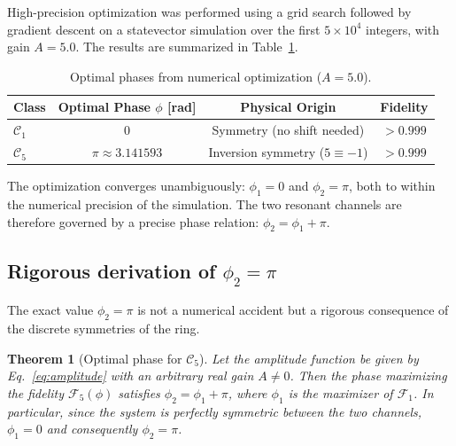 \documentclass[12pt,a4paper]{article}
\theoremstyle{plain}
\newtheorem{theorem}{Theorem}[section]
\theoremstyle{definition}
\theoremstyle{remark}
\begin{document}
High-precision optimization was performed using a grid search followed by gradient descent on a statevector simulation over the first \(5 \times 10^4\) integers, with gain \(A = 5.0\). The results are summarized in Table~\ref{tab:phases}.

\begin{table}[H]
\centering
\caption{Optimal phases from numerical optimization (\(A=5.0\)).}
\label{tab:phases}
\begin{tabular}{lccc}
\toprule
Class & Optimal Phase \(\phi\) [rad] & Physical Origin & Fidelity \\
\midrule
\(\mathcal{C}_1\) & \(0\) & Symmetry (no shift needed) & \(>0.999\) \\
\(\mathcal{C}_5\) & \(\pi \approx 3.141593\) & Inversion symmetry (\(5 \equiv -1\)) & \(>0.999\) \\
\bottomrule
\end{tabular}
\end{table}

The optimization converges unambiguously: \(\phi_1 = 0\) and \(\phi_2 = \pi\), both to within the numerical precision of the simulation. The two resonant channels are therefore governed by a precise phase relation: \(\phi_2 = \phi_1 + \pi\).

\subsection{Rigorous derivation of \(\phi_2 = \pi\)}
The exact value \(\phi_2 = \pi\) is not a numerical accident but a rigorous consequence of the discrete symmetries of the ring.

\begin{theorem}[Optimal phase for \(\mathcal{C}_5\)]
\label{thm:phi2}
Let the amplitude function be given by Eq.~\eqref{eq:amplitude} with an arbitrary real gain \(A \neq 0\). Then the phase maximizing the fidelity \(\mathcal{F}_5(\phi)\) satisfies \(\phi_2 = \phi_1 + \pi\), where \(\phi_1\) is the maximizer of \(\mathcal{F}_1\). In particular, since the system is perfectly symmetric between the two channels, \(\phi_1 = 0\) and consequently \(\phi_2 = \pi\).
\end{theorem}
\end{document}
